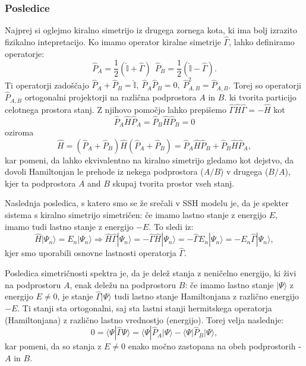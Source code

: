 \subsubsection{Posledice}
Najprej si oglejmo kiralno simetrijo iz drugega zornega kota, ki ima bolj izrazito fizikalno intepretacijo. Ko imamo operator kiralne simetrije $\hat{\Gamma}$, lahko definiramo operatorje:
\begin{equation}
\hat{P}_A = \frac{1}{2} ( \hat{\mathbb{I}} + \hat{\Gamma}) \ \ \hat{P}_B = \frac{1}{2} (\hat{\mathbb{I}} - \hat{\Gamma}).
\end{equation}
Ti operatorji zadoščajo $\hat{P}_A + \hat{P}_B = \hat{\mathbb{I}},\  \hat{P}_A \hat{P}_B = 0,\  \hat{P}_{A,B}^2 = \hat{P}_{A,B}$. Torej so operatorji $\hat{P}_{A,B}$ ortogonalni projektorji na različna podprostora $A$ in $B$. ki tvorita particijo celotnega prostora stanj.
Z njihovo pomočjo lahko prepišemo $\hat{\Gamma} \hat{H} \hat{\Gamma} = -\hat{H}$ kot
\begin{equation}
\hat{P}_A \hat{H} \hat{P}_A = \hat{P}_B \hat{H} \hat{P}_B = 0
\end{equation}
oziroma
\begin{equation}
 \hat{H} = \left( \hat{P}_A + \hat{P}_B \right) \hat{H}  \left( \hat{P}_A + \hat{P}_B \right)  = \hat{P}_A \hat{H} \hat{P}_B + \hat{P}_B \hat{H} \hat{P}_A,
\end{equation}
kar pomeni, da lahko ekvivalentno na kiralno simetrijo gledamo kot dejstvo, da dovoli Hamiltonjan le prehode iz nekega podprostora ($A/B$) v drugega ($B/A$), kjer ta podprostora $A$ and $B$ skupaj tvorita prostor vseh stanj.

Naslednja posledica, s katero smo se že srečali v SSH modelu je, da je spekter sistema s kiralno simetrijo simetričen: če imamo lastno stanje z energijo $E$, imamo tudi lastno stanje z energijo $-E$. To sledi iz:
\begin{equation}
\hat{H} | \Psi_n \rangle = E_n | \Psi_n \rangle  \Rightarrow \hat{H} \hat{\Gamma} |\Psi_n \rangle = - \hat{\Gamma} \hat{H} | \Psi_n \rangle = - \hat{\Gamma} E_n | \Psi_n \rangle = - E_n \hat{\Gamma} | \Psi_n \rangle,
\end{equation}
kjer smo uporabili osnovne lastnosti operatorja $\hat{\Gamma}$. 

Posledica simetričnosti spektra je, da je delež stanja z neničelno energijo, ki živi na podprostoru $A$, enak deležu na podprostoru $B$: če imamo lastno stanje $| \Psi \rangle$ z energijo $E \neq 0$, je stanje $\hat{\Gamma} | \Psi \rangle$ tudi lastno stanje Hamiltonjana z različno energijo $-E$. Ti stanji sta ortogonalni, saj sta lastni stanji hermitskega operatorja (Hamiltonjana) z različno lastno vrednostjo (energijo). Torej velja naslednje:
\begin{equation}
0 = \langle \Psi | \hat{\Gamma}  \Psi \rangle = \langle \Psi | \hat{P}_A | \Psi \rangle - \langle \Psi | \hat{P}_B | \Psi \rangle,
\end{equation}
kar pomeni, da so stanja z $E \neq 0$ enako močno zastopana na obeh podprostorih - $A$ in $B$.


